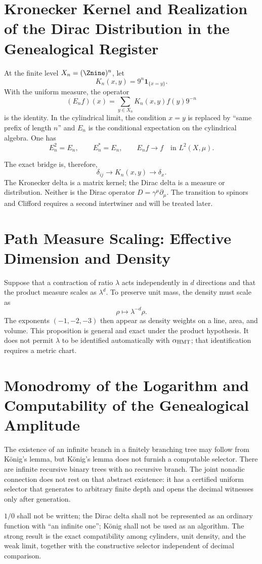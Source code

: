 \section{Kronecker Kernel and Realization of the Dirac Distribution in the Genealogical Register}

At the finite level \(X_n=(\Znine)^n\), let
\[
K_n(x,y)=9^n\mathbf1_{\{x=y\}}.
\]
With the uniform measure, the operator
\[
(E_nf)(x)=\sum_{y\in X_n}K_n(x,y)f(y)9^{-n}
\]
is the identity. In the cylindrical limit, the condition \(x=y\) is replaced by
“same prefix of length \(n\)” and \(E_n\) is the conditional expectation on
the cylindrical algebra. One has
\[
E_n^2=E_n,\qquad E_n^*=E_n,\qquad E_nf\to f
\quad\text{in }L^2(X,\mu).
\]

The exact bridge is, therefore,
\[
\delta_{ij}
\longrightarrow K_n(x,y)
\longrightarrow\delta_x.
\]
The Kronecker delta is a matrix kernel; the Dirac delta is a measure or
distribution. Neither is the Dirac operator
\(D=\gamma^\mu\partial_\mu\). The transition to spinors and Clifford requires
a second intertwiner and will be treated later.

\section{Path Measure Scaling: Effective Dimension and Density}

Suppose that a contraction of ratio \(\lambda\) acts independently
in \(d\) directions and that the product measure scales as \(\lambda^d\). To
preserve unit mass, the density must scale as
\[
\rho\longmapsto\lambda^{-d}\rho.
\]
The exponents \((-1,-2,-3)\) then appear as density weights on a line,
area, and volume. This proposition is general and exact under the product
hypothesis. It does not permit \(\lambda\) to be identified automatically with
\(\alpha_{\rm HMT}\); that identification requires a metric chart.

\section{Monodromy of the Logarithm and Computability of the Genealogical Amplitude}

The existence of an infinite branch in a finitely branching tree may
follow from König's lemma, but König's lemma does not furnish a computable selector. There
are infinite recursive binary trees with no recursive branch. The joint nonadic
connection does not rest on that abstract existence: it has a certified uniform
selector that generates to arbitrary finite depth and opens the decimal witnesses
only after generation.

\begin{falsadorBox}[title={Three prohibited confusions}]
\(1/0\) shall not be written; the Dirac delta shall not be represented as an ordinary
function with “an infinite one”; König shall not be used as an algorithm. The strong
result is the exact compatibility among cylinders, unit density, and the weak
limit, together with the constructive selector independent of decimal comparison.
\end{falsadorBox}
